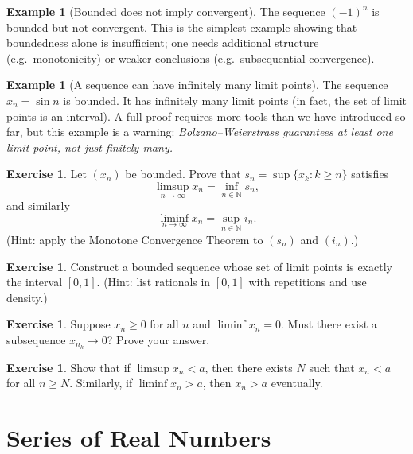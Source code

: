 \documentclass[12pt]{article}
\numberwithin{equation}{section}
\newcommand{\NN}{\mathbb{N}}
\theoremstyle{plain}
\theoremstyle{definition}
\newtheorem{example}[theorem]{Example}
\newtheorem{exercise}[theorem]{Exercise}
\theoremstyle{remark}
\begin{document}
\begin{example}[Bounded does not imply convergent]
The sequence $(-1)^n$ is bounded but not convergent.
This is the simplest example showing that boundedness alone is insufficient; one needs additional structure (e.g.\ monotonicity) or weaker conclusions (e.g.\ subsequential convergence).
\end{example}

\begin{example}[A sequence can have infinitely many limit points]
The sequence $x_n=\sin n$ is bounded. It has infinitely many limit points (in fact, the set of limit points is an interval).
A full proof requires more tools than we have introduced so far, but this example is a warning:
\emph{Bolzano--Weierstrass guarantees at least one limit point, not just finitely many.}
\end{example}

\begin{exercise}
Let $(x_n)$ be bounded. Prove that $s_n=\sup\{x_k:k\ge n\}$ satisfies
\[
\limsup_{n\to\infty} x_n = \inf_{n\in\NN} s_n,
\]
and similarly
\[
\liminf_{n\to\infty} x_n = \sup_{n\in\NN} i_n.
\]
(Hint: apply the Monotone Convergence Theorem to $(s_n)$ and $(i_n)$.)
\end{exercise}

\begin{exercise}
Construct a bounded sequence whose set of limit points is exactly the interval $[0,1]$.
(Hint: list rationals in $[0,1]$ with repetitions and use density.)
\end{exercise}

\begin{exercise}
Suppose $x_n\ge 0$ for all $n$ and $\liminf x_n = 0$. Must there exist a subsequence $x_{n_k}\to 0$?
Prove your answer.
\end{exercise}

\begin{exercise}
Show that if $\limsup x_n < a$, then there exists $N$ such that $x_n<a$ for all $n\ge N$.
Similarly, if $\liminf x_n > a$, then $x_n>a$ eventually.
\end{exercise}

\newpage


\section{Series of Real Numbers}
\end{document}
